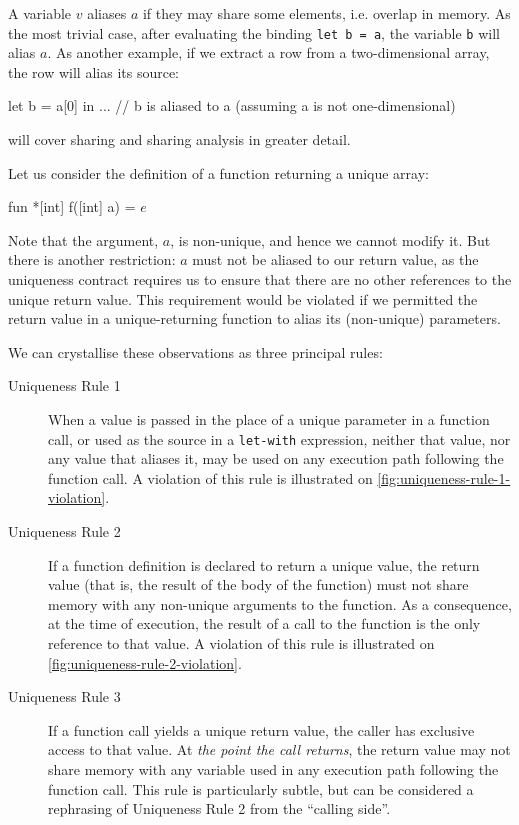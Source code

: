 A variable $v$ aliases $a$ if they may share some elements,
i.e. overlap in memory.  As the most trivial case, after evaluating
the binding \texttt{let b = a}, the variable \texttt{b} will alias
\texttt{$a$}.  As another example, if we extract a row from a
two-dimensional array, the row will alias its source:
\begin{colorcode}
let b = a[0] in
... // b is aliased to a (assuming a is not one-dimensional)
\end{colorcode}
 will cover sharing and sharing analysis in
greater detail.

Let us consider the definition of a function returning a unique array:

\begin{colorcode}
fun *[int] f([int] a) = \(e\)
\end{colorcode}

Note that the argument, \texttt{$a$}, is non-unique, and hence we cannot
modify it.  But there is another restriction: \texttt{$a$} must not be
aliased to our return value, as the uniqueness contract requires us to
ensure that there are no other references to the unique return value.
This requirement would be violated if we permitted the return value in
a unique-returning function to alias its (non-unique) parameters.

We can crystallise these observations as three principal rules:

\begin{description}
\item[Uniqueness Rule 1] When a value is passed in the place of a
  unique parameter in a function call, or used as the source in a
  \texttt{let-with} expression, neither that value, nor any value that
  aliases it, may be used on any execution path following the function
  call.  A violation of this rule is illustrated on
  \cref{fig:uniqueness-rule-1-violation}.

\item[Uniqueness Rule 2] If a function definition is declared to
  return a unique value, the return value (that is, the result of the
  body of the function) must not share memory with any non-unique
  arguments to the function.  As a consequence, at the time of
  execution, the result of a call to the function is the only
  reference to that value.  A violation of this rule is illustrated on
  \cref{fig:uniqueness-rule-2-violation}.

\item[Uniqueness Rule 3] If a function call yields a unique return
  value, the caller has exclusive access to that value.  At
  \textit{the point the call returns}, the return value may not share
  memory with any variable used in any execution path following the
  function call.  This rule is particularly subtle, but can be
  considered a rephrasing of Uniqueness Rule 2 from the ``calling
  side''.
\end{description}

